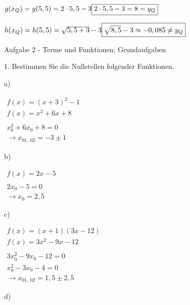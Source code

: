 \documentclass[varwidth]{article}
\begin{document}
$
g(x_Q) = g(5,5) = 2\cdot5,5-3 \\~\\
\boxed{ 2\cdot5,5-3 = 8 = y_Q }
$

\vspace*{8mm}

$
h(x_Q) = h(5,5) = \sqrt{5,5+3}-3 \\~\\
\boxed{ \sqrt{8,5}-3 \approx -0,085 \neq y_Q }
$

\vspace*{20mm}

\pagebreak
{ \Large Aufgabe 2 - Terme und Funktionen: Grundaufgaben}

{ \large 1. Bestimmen Sie die Nullstellen folgender Funktionen. }

\vspace*{5mm}

a)

$
\begin{array}{l}
f(x) = (x+3)^2 - 1 \\
f(x) = x^2 + 6x + 8 \\~\\
x_0^2 + 6x_0 + 8 = 0 \\
\rightarrow \boxed{x_{01,~ 02} = -3 \pm 1}
\end{array}
$

\vspace*{5mm}

b)

$
\begin{array}{l}
f(x) = 2x-5 \\~\\
2x_0-5 = 0 \\
\rightarrow \boxed{x_0 = 2,5}
\end{array}
$

\vspace*{5mm}

c) 

$
\begin{array}{l}
f(x) = (x+1)(3x-12) \\
f(x) = 3x^2 - 9x - 12 \\~\\
3x_0^2 - 9x_0 - 12 = 0 \\
x_0^2 - 3x_0 - 4 = 0 \\
\rightarrow \boxed{ x_{01,~ 02} = 1,5 \pm 2,5 }
\end{array}
$

\vspace*{5mm}

d)
\end{document}
